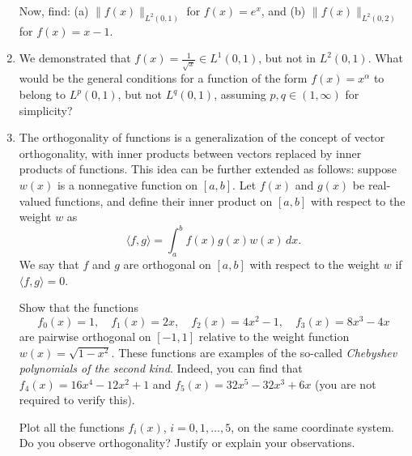 \documentclass[6pt]{article}
\numberwithin{equation}{section}
\begin{document}
\begin{enumerate}
Now, find:
(a) \( \| f(x) \|_{L^2(0,1)} \) for \( f(x) = e^x \), and   (b) \( \| f(x) \|_{L^2(0,2)} \) for \( f(x) = x - 1 \).


\item We demonstrated that \( f(x) = \frac{1}{\sqrt{x}} \in L^1(0,1) \), but not in \( L^2(0,1) \). What would be the general conditions for a function of the form \( f(x) = x^\alpha \) to belong to \( L^p(0,1) \), but not \( L^q(0,1) \), assuming \( p, q \in (1, \infty) \) for simplicity?



\item

The orthogonality of functions is a generalization of the concept of vector orthogonality, with inner products between vectors replaced by inner products of functions. This idea can be further extended as follows: suppose \( w(x) \) is a nonnegative function on \( [a, b] \). Let \( f(x) \) and \( g(x) \) be real-valued functions, and define their inner product on \( [a, b] \) with respect to the weight \( w \) as
\[\langle f, g \rangle = \int_a^b f(x) g(x) w(x) \, dx.\]
We say that \( f \) and \( g \) are orthogonal on \( [a, b] \) with respect to the weight \( w \) if \( \langle f, g \rangle = 0 \).

Show that the functions
\[f_0(x) = 1, \quad f_1(x) = 2x, \quad f_2(x) = 4x^2 - 1, \quad f_3(x) = 8x^3 - 4x\]
are pairwise orthogonal on \( [-1, 1] \) relative to the weight function \( w(x) = \sqrt{1 - x^2} \).  These functions are examples of the so-called \textit{Chebyshev polynomials of the second kind}. Indeed, you can find that \( f_4(x) = 16x^4 - 12x^2 + 1 \) and \( f_5(x) = 32x^5 - 32x^3 + 6x \) (you are not required to verify this).

Plot all the functions \( f_i(x) \), \( i = 0, 1, \ldots, 5 \), on the same coordinate system. Do you observe orthogonality? Justify or explain your observations.




\end{enumerate}
\end{document}

